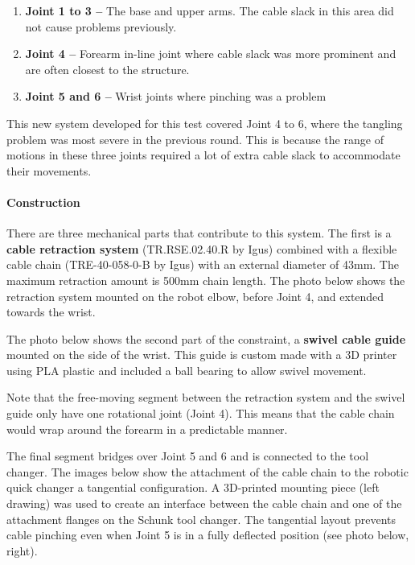 \begin{enumerate}
	\item \textbf{Joint 1 to 3 --} The base and upper arms. The cable slack in this area did not cause problems previously.

	\item \textbf{Joint 4 --} Forearm in-line joint where cable slack was more prominent and are often closest to the structure.

	\item \textbf{Joint 5 and 6 --} Wrist joints where pinching was a problem

\end{enumerate}
This new system developed for this test covered Joint 4 to 6, where the tangling problem was most severe in the previous round. This is because the range of motions in these three joints required a lot of extra cable slack to accommodate their movements. 

\paragraph{Construction}

There are three mechanical parts that contribute to this system. The first is a \textbf{cable retraction system} (TR.RSE.02.40.R by Igus) combined with a flexible cable chain (TRE-40-058-0-B by Igus) with an external diameter of 43mm. The maximum retraction amount is 500mm chain length. The photo below shows the retraction system mounted on the robot elbow, before Joint 4, and extended towards the wrist.





The photo below shows the second part of the constraint, a \textbf{swivel cable guide} mounted on the side of the wrist. This guide is custom made with a 3D printer using PLA plastic and included a ball bearing to allow swivel movement. 

Note that the free-moving segment between the retraction system and the swivel guide only have one rotational joint (Joint 4). This means that the cable chain would wrap around the forearm in a predictable manner. 



The final segment bridges over Joint 5 and 6 and is connected to the tool changer. The images below show the attachment of the cable chain to the robotic quick changer a tangential configuration. A 3D-printed mounting piece (left drawing) was used to create an interface between the cable chain and one of the attachment flanges on the Schunk tool changer. The tangential layout prevents cable pinching even when Joint 5 is in a fully deflected position (see photo below, right). 

